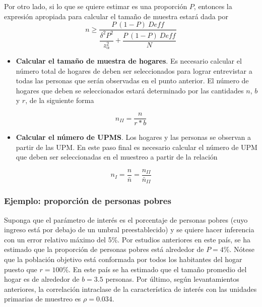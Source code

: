 \documentclass[
  10pt,
  spanish,
]{book}
\providecommand{\tightlist}{%
  \setlength{\itemsep}{0pt}\setlength{\parskip}{0pt}}
\begin{document}
Por otro lado, si lo que se quiere estimar es una proporción \(P\), entonces la expresión apropiada para calcular el tamaño de muestra estará dada por
\[
n \geq \dfrac{P\ (1-P)\ Deff}{\dfrac{\delta^2P^2}{z_{\alpha}^2 }+\dfrac{P\ (1-P) \ Deff}{N}}
\]

\begin{itemize}
\tightlist
\item
  \textbf{Calcular el tamaño de muestra de hogares}. Es necesario calcular el número total de hogares de deben ser seleccionados para lograr entrevistar a todas las personas que serán observadas en el punto anterior. El número de hogares que deben se seleccionados estará determinado por las cantidades \(n\), \(b\) y \(r\), de la siguiente forma
\end{itemize}

\[
n_{II} = \dfrac{n}{r * b}
\]

\begin{itemize}
\tightlist
\item
  \textbf{Calcular el número de UPMS}. Los hogares y las personas se observan a partir de las UPM. En este paso final es necesario calcular el número de UPM que deben ser seleccionadas en el muestreo a partir de la relación
\end{itemize}

\[
n_{I} = \frac{n}{\bar{n}} 
= \frac{n_{II}}{\bar{n}_{II}}
\]

\hypertarget{ejemplo-proporciuxf3n-de-personas-pobres}{%
\subsubsection*{Ejemplo: proporción de personas pobres}\label{ejemplo-proporciuxf3n-de-personas-pobres}}

Suponga que el parámetro de interés es el porcentaje de personas pobres (cuyo ingreso está por debajo de un umbral preestablecido) y se quiere hacer inferencia con un error relativo máximo del 5\%. Por estudios anteriores en este país, se ha estimado que la proporción de personas pobres está alrededor de \(P = 4\)\%. Nótese que la población objetivo está conformada por todos los habitantes del hogar puesto que \(r = 100\)\%. En este país se ha estimado que el tamaño promedio del hogar es de alrededor de \(b = 3.5\) personas. Por último, según levantamientos anteriores, la correlación intraclase de la característica de interés con las unidades primarias de muestreo es \(\rho = 0.034\).
\end{document}
